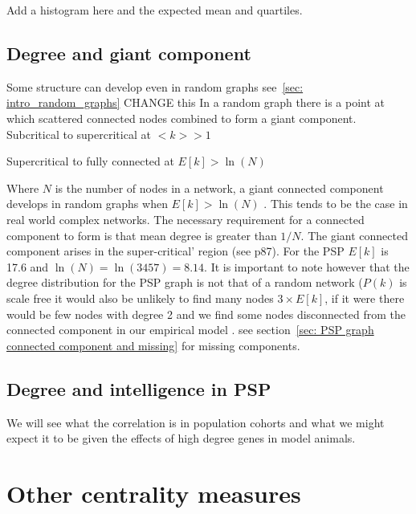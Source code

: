Add a histogram here and the expected mean and quartiles.


\subsection{Degree and giant component}
\label{sec:connected component and degree}
Some structure can develop even in random graphs see~\ref{sec: intro_random_graphs}
 CHANGE this
In a random graph there is a point at which scattered connected nodes combined to form a giant component. Subcritical to supercritical at $<k> >1$


Supercritical to fully connected at $E[k] > \ln(N)$


Where $N$ is the number of nodes in a network, a giant connected component develops in random graphs when $E[k] > \ln (N)$ \cite{barabasi2016network}. This tends to be the case in real world complex networks. The necessary requirement for a connected component to form is that mean degree is greater than $1/N$. The giant connected component arises in the super-critical' region (see \cite{barabasi2016network} p87). For the PSP $E[k]$ is 17.6 and $\ln(N)=\ln(3457)=8.14$.  It is important to note however that the degree distribution for the PSP graph is not that of a random network ($P(k)$ is scale free it would also be unlikely to find many nodes $ 3 \times E[k]$, if it were there would be few nodes with degree 2 and we find some nodes disconnected from the connected component in our empirical model .   see section~\ref{sec: PSP graph connected component and missing} for missing components.


\subsection{Degree and intelligence in PSP}
We will see what the correlation is in population cohorts and what we might expect it to be given the effects of high degree genes in model animals. 


\section{Other centrality measures}

